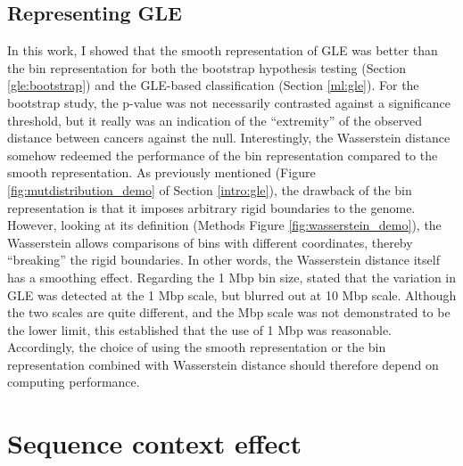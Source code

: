 

\subsection{Representing GLE}
In this work, I showed that the smooth representation of GLE was better than the bin representation for both the bootstrap hypothesis testing (Section \ref{gle:bootstrap}) and the GLE-based classification (Section \ref{ml:gle}). For the bootstrap study, the p-value was not necessarily contrasted against a significance threshold, but it really was an indication of the ``extremity'' of the observed distance between cancers against the null. Interestingly, the Wasserstein distance somehow redeemed the performance of the bin representation compared to the smooth representation. As previously mentioned (Figure \ref{fig:mutdistribution_demo} of Section \ref{intro:gle}), the drawback of the bin representation is that it imposes arbitrary rigid boundaries to the genome. However, looking at its definition (Methods Figure \ref{fig:wasserstein_demo}), the Wasserstein allows comparisons of bins with different coordinates, thereby ``breaking'' the rigid boundaries. In other words, the Wasserstein distance itself has a smoothing effect. Regarding the 1 Mbp bin size, \citet{Hodgkinson2012TheGenomes} stated that the variation in GLE was detected at the 1 Mbp scale, but blurred out at 10 Mbp scale. Although the two scales are quite different, and the Mbp scale was not demonstrated to be the lower limit, this established that the use of 1 Mbp was reasonable. Accordingly, the choice of using the smooth representation or the bin representation combined with Wasserstein distance should therefore depend on computing performance. 

\section{Sequence context effect}
